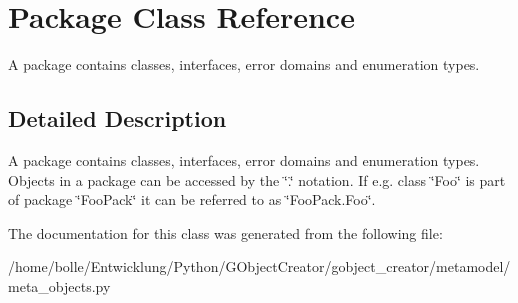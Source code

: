 \hypertarget{classPackage}{
\section{Package Class Reference}
\label{classPackage}
}


A package contains classes, interfaces, error domains and enumeration types.  




\subsection{Detailed Description}
A package contains classes, interfaces, error domains and enumeration types. Objects in a package can be accessed by the \char`\"{}.\char`\"{} notation. If e.g. class \char`\"{}Foo\char`\"{} is part of package \char`\"{}FooPack\char`\"{} it can be referred to as \char`\"{}FooPack.Foo\char`\"{}. 

The documentation for this class was generated from the following file:\begin{DoxyCompactItemize}
\item 
/home/bolle/Entwicklung/Python/GObjectCreator/gobject\_\-creator/metamodel/meta\_\-objects.py\end{DoxyCompactItemize}
